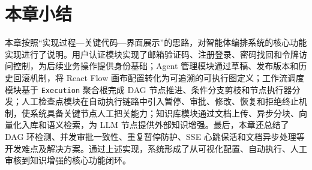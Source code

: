 \section{本章小结}

本章按照“实现过程—关键代码—界面展示”的思路，对智能体编排系统的核心功能实现进行了说明。用户认证模块实现了邮箱验证码、注册登录、密码找回和令牌访问控制，为后续业务操作提供身份基础；Agent 管理模块通过草稿、发布版本和历史回滚机制，将 React Flow 画布配置转化为可追溯的可执行图定义；工作流调度模块基于 \texttt{Execution} 聚合根完成 DAG 节点推进、条件分支剪枝和节点执行器分发；人工检查点模块在自动执行链路中引入暂停、审批、修改、恢复和拒绝终止机制，使系统具备关键节点人工把关能力；知识库模块通过文档上传、异步分块、向量化入库和语义检索，为 LLM 节点提供外部知识增强。最后，本章还总结了 DAG 环检测、并发审批一致性、重复暂停防护、SSE 心跳保活和文档异步处理等开发难点及解决方案。通过上述实现，系统形成了从可视化配置、自动执行、人工审核到知识增强的核心功能闭环。
